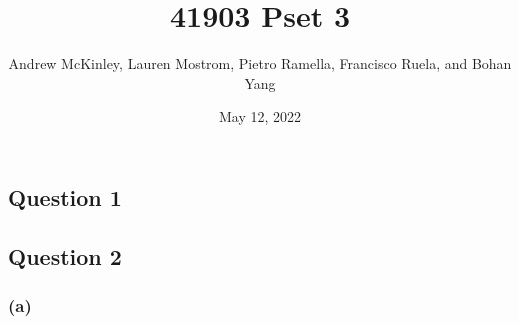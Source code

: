 \documentclass[
]{article}
\title{41903 Pset 3}
\author{Andrew McKinley, Lauren Mostrom, Pietro Ramella, Francisco
Ruela, and Bohan Yang}
\date{May 12, 2022}
\begin{document}
\maketitle

\hypertarget{question-1}{%
\subsection{Question 1}\label{question-1}}

\newpage

\hypertarget{question-2}{%
\subsection{Question 2}\label{question-2}}

\hypertarget{a}{%
\subsubsection{(a)}\label{a}}
\end{document}
